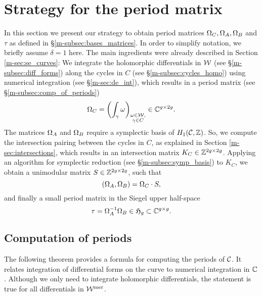 \documentclass[main.tex]{subfiles}
\begin{document}
  \section{Strategy for the period matrix}\label{sec:strat_pm}

  In this section we present our strategy to obtain period matrices $\Omega_C, \Omega_A, \Omega_B$ and $\tau$ as defined in \S \ref{m-subsec:bases_matrices}. In order to simplify notation,
  we briefly assume $\delta = 1$ here. The main ingredients were already described in
  Section \ref{m-sec:se_curves}: \abstand We integrate the holomorphic differentials in $\mathcal{W}$ (see \S \ref{m-subsec:diff_forms})
  along the cycles in $C$ (see  \S \ref{m-subsec:cycles_homo}) using numerical integration (see \S \ref{m-sec:de_int}), which results in a period matrix (see \S \ref{m-subsec:comp_of_periods})
  \begin{equation}
      \label{eq:OC}
    \Omega_C = \left( \int_{\gamma} \omega \right)_{\substack{\omega \in \mathcal{W}, \\ \gamma \in C}} \in \mathbb{C}^{g \times 2g}.
  \end{equation}
  The matrices $\Omega_A$ and $\Omega_B$ require a symplectic basis of $H_1(\mathcal{C},\mathbb{Z})$.
  So, we compute the intersection pairing between the cycles in $C$, as explained in Section \ref{m-sec:intersections}, which results in an
  intersection matrix $K_C \in \mathbb{Z}^{2g \times 2g}$. \abstand
  Applying an algorithm for symplectic reduction (see \S \ref{m-subsec:symp_basis}) to $K_C$, we obtain a unimodular matrix $S \in \mathbb{Z}^{2g \times 2g}$, such that
  \begin{equation}
      \label{eq:OAOB}
      (  \Omega_A,  \Omega_B  ) = \Omega_C \cdot S,
  \end{equation}
   and finally a small period matrix in the Siegel upper half-space
  \begin{equation}
      \label{eq:tau}
   \tau = \Omega_A^{-1} \Omega_B \in \mathfrak{H}_g \subset \mathbb{C}^{g \times g}.
  \end{equation}

  \bigskip

  \subsection{Computation of periods}\label{subsec:comp_of_periods}

  The following theorem provides a formula for computing the periods of $\mathcal{C}$. It relates integration of differential forms on the curve to numerical integration in $\mathbb{C}$.
  Although we only need to integrate holomorphic
  differentials, the statement is true for all differentials in $\mathcal{W}^{\text{mer}}$.
\end{document}
